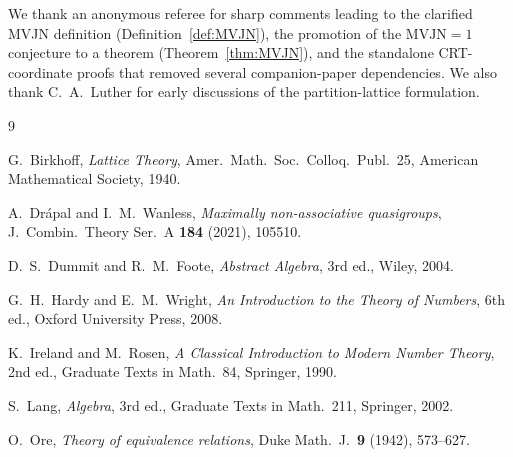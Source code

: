 \documentclass[11pt,reqno]{amsart}
\theoremstyle{plain}
\theoremstyle{definition}
\newcommand{\MVJN}{\mathrm{MVJN}}
\begin{document}
We thank an anonymous referee for sharp comments leading to the clarified MVJN definition (Definition~\ref{def:MVJN}), the promotion of the $\MVJN = 1$ conjecture to a theorem (Theorem~\ref{thm:MVJN}), and the standalone CRT-coordinate proofs that removed several companion-paper dependencies. We also thank C.~A.~Luther for early discussions of the partition-lattice formulation.

\begin{thebibliography}{9}

G.~Birkhoff,
\emph{Lattice Theory},
Amer.\ Math.\ Soc.\ Colloq.\ Publ.\ 25,
American Mathematical Society, 1940.

A.~Drápal and I.~M.~Wanless,
\emph{Maximally non-associative quasigroups},
J.\ Combin.\ Theory Ser.\ A \textbf{184} (2021), 105510.

D.~S.~Dummit and R.~M.~Foote,
\emph{Abstract Algebra}, 3rd ed.,
Wiley, 2004.

G.~H.~Hardy and E.~M.~Wright,
\emph{An Introduction to the Theory of Numbers}, 6th ed.,
Oxford University Press, 2008.

K.~Ireland and M.~Rosen,
\emph{A Classical Introduction to Modern Number Theory}, 2nd ed.,
Graduate Texts in Math.\ 84, Springer, 1990.

S.~Lang,
\emph{Algebra}, 3rd ed.,
Graduate Texts in Math.\ 211, Springer, 2002.

O.~Ore,
\emph{Theory of equivalence relations},
Duke Math.\ J.\ \textbf{9} (1942), 573--627.

\end{thebibliography}
\end{document}
